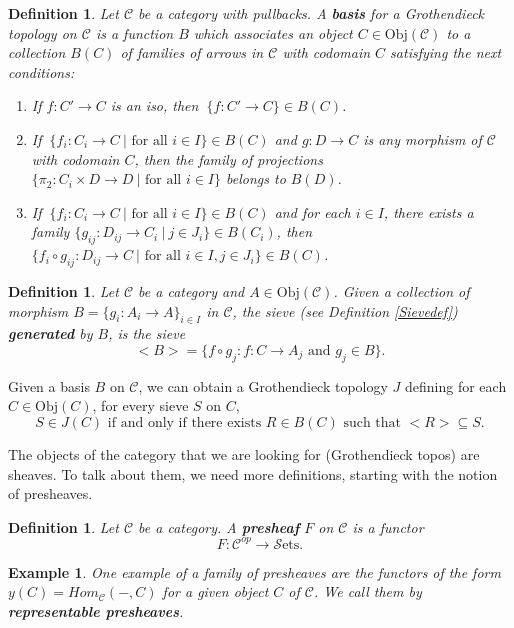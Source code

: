 \documentclass[10pt,longbibliography]{article}
\newtheorem{Def}[Theo]{Definition}
\newtheorem{Example}[Theo]{Example}
\newcommand{\C}{\mathcal{C}}
\newcommand{\Sets}{\mathcal{S}\text{ets}}
\begin{document}
\begin{Def}
	Let $\C$ be a category with pullbacks. A \textbf{basis} for a Grothendieck topology on $\C$ is a function $B$ which associates an object $C \in \text{Obj}(\C)$ to a collection $B(C)$ of families of arrows in $\C$ with codomain $C$ satisfying the next conditions:
	
	\begin{enumerate}
		\item If $f: C' \to C$ is an iso, then $~\{f:C' \to C\} \in B(C)$.
		
		\item If $~\{f_{i}: C_{i} \to C ~ |\text{ for all }i \in I\} \in B(C)$ and $g: D
		 \to C$ is any morphism of $\C$ with codomain $C$, then the family of projections $\{ \pi_{2}: C_{i} \times D \to D~|\text{ for all } i \in I\}$ belongs to $B(D)$.
		 
		\item If $~\{f_{i}: C_{i} \to C ~ |\text{ for all }i \in I\} \in B(C)$ and for each $i \in I$, there exists a family $\{g_{ij}: D_{ij} \to C_{i}~|~ j \in J_{i}\} \in B(C_{i})$, then $\{f_{i} \circ g_{ij}: D_{ij} \to C ~|\text{ for all }i \in I, j \in J_{i}\} \in B(C)$.
	\end{enumerate}
\end{Def}
\begin{Def}
	Let $\C$ be a category and $A \in \text{Obj}(\C)$. Given a collection of morphism $B = \{g_{i}:A_{i} \to A\}_{ i \in I }$ in $\C$, the sieve (see Definition \ref{Sievedef}) \textbf{generated} by $B$, is the sieve $$<B> = \{f \circ g_{j}: f: C \to A_{j} \text{ and } g_{j} \in B\}.$$ 
\end{Def}

Given a basis $B$ on $\C$, we can obtain a Grothendieck topology $J$ defining for each $C \in \text{Obj}(C)$, for every sieve $S$ on $C$,
$$S \in J(C) \text{ if and only if there exists } R \in B(C)\text{ such that }<R> \subseteq S. $$


The objects of the category that we are looking for (Grothendieck topos) are sheaves. To talk about them, we need more definitions, starting with the notion of presheaves. 

\begin{Def}\label{presheafdef}
	Let $\C$ be a category. A \textbf{presheaf} $F$ on $\C$ is a functor
	$$F: \C^{op} \to \Sets.$$
	
\end{Def}

\begin{Example}\label{Representablepresheaf}
One example of a family of presheaves are the functors of the form $y(C)=Hom_{\C}( - ,C)$ for a given object $C$ of $\C$. We call them by \textbf{representable presheaves}.
\end{Example}
\end{document}
